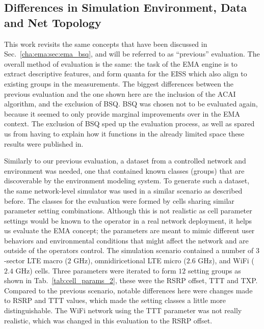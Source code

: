 	
		\subsection{Differences in Simulation Environment, Data and Net Topology}
		
			This work revisits the same concepts that have been discussed in Sec.~\ref{cha:ema:sec:ema_bsq}, and will be referred to as ``previous'' evaluation.
			The overall method of evaluation is the same: the task of the \ac{EMA} engine is to extract descriptive features, and form quanta for the \ac{EISS} which also align to existing groups in the measurements.
			The biggest differences between the previous evaluation and the one shown here are the inclusion of the \ac{ACAI} algorithm, and the exclusion of \ac{BSQ}.
			\ac{BSQ} was chosen not to be evaluated again, because it seemed to only provide marginal improvements over \kmeans{} in the \ac{EMA} context.
			The exclusion of \ac{BSQ} sped up the evaluation process, as well as spared us from having to explain how it functions in the already limited space these results were published in.
			
			Similarly to our previous evaluation, a dataset from a controlled network and environment was needed, one that contained known classes (groups) that are discoverable by the environment modeling system.
			To generate such a dataset, the same network-level simulator was used in a similar scenario as described before.
			The classes for the evaluation were formed by cells sharing similar parameter setting combinations. 
			Although this is not realistic as cell parameter settings would be known to the operator in a real network deployment, it helps us evaluate the \ac{EMA} concept; the parameters are meant to mimic different user behaviors and environmental conditions that might affect the network and are outside of the operators control.
			The simulation scenario contained a number of $3$-sector \ac{LTE} macro ($2$ GHz), omnidiricetional \ac{LTE} micro ($2.6$ GHz), and WiFi ($2.4$ GHz) cells.
			Three parameters were iterated to form $12$ setting groups as shown in Tab.~\ref{tab:cell_params_2}, these were the \ac{RSRP} offset, \ac{TTT} and \ac{TXP}.
			Compared to the previous scenario, notable differences here were changes made to \ac{RSRP} and \ac{TTT} values, which made the setting classes a little more distinguishable.
			The WiFi network using the \ac{TTT} parameter was not really realistic, which was changed in this evaluation to the \ac{RSRP} offset.
			
